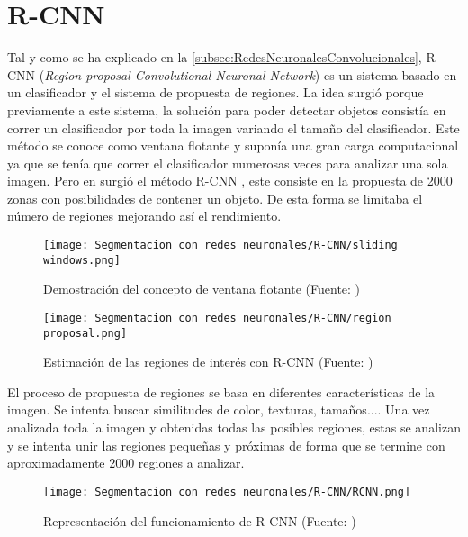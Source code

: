 \newpage
\section{R-CNN}
Tal y como se ha explicado en la \autoref{subsec:RedesNeuronalesConvolucionales}, R-CNN (\textit{Region-proposal Convolutional Neuronal Network}) es un sistema basado en un clasificador y el sistema de propuesta de regiones. La idea surgió porque previamente a este sistema, la solución para poder detectar objetos consistía en correr un clasificador por toda la imagen variando el tamaño del clasificador. Este método se conoce como ventana flotante y suponía una gran carga computacional ya que se tenía que correr el clasificador numerosas veces para analizar una sola imagen. Pero en  surgió el método R-CNN \cite{RCNN}, este consiste en la propuesta de 2000 zonas con posibilidades de contener un objeto. De esta forma se limitaba el número de regiones mejorando así el rendimiento.

	\begin{figure}[ht]
		\centering
		\texttt{[image: Segmentacion con redes neuronales/R-CNN/sliding windows.png]}
		\caption{Demostración del concepto de ventana flotante (Fuente: \citep{Review_RCNN})}
		\label{fig:R-CNN sliding window}
		\vspace{-5pt}
	\end{figure}
	
	\begin{figure}[ht]
	\centering
	\texttt{[image: Segmentacion con redes neuronales/R-CNN/region proposal.png]}
	\caption[Estimación de las regiones de interés con R-CNN]{Estimación de las regiones de interés con R-CNN (Fuente: \citep{Review_RCNN})}
	\label{fig:R-CNN region proposal}
	\vspace{-5pt}
	\end{figure}

El proceso de propuesta de regiones se basa en diferentes características de la imagen. Se intenta buscar similitudes de color, texturas, tamaños.... Una vez analizada toda la imagen y obtenidas todas las posibles regiones, estas se analizan y se intenta unir las regiones pequeñas y próximas de forma que se termine con aproximadamente 2000 regiones a analizar.

	\begin{figure}[ht]
	\centering
	\texttt{[image: Segmentacion con redes neuronales/R-CNN/RCNN.png]}
	\caption[Representación del funcionamiento de R-CNN]{Representación del funcionamiento de R-CNN (Fuente: \citep{RCNN})}
	\label{fig:R-CNN esquema}
	\vspace{-5pt}
	\end{figure}

